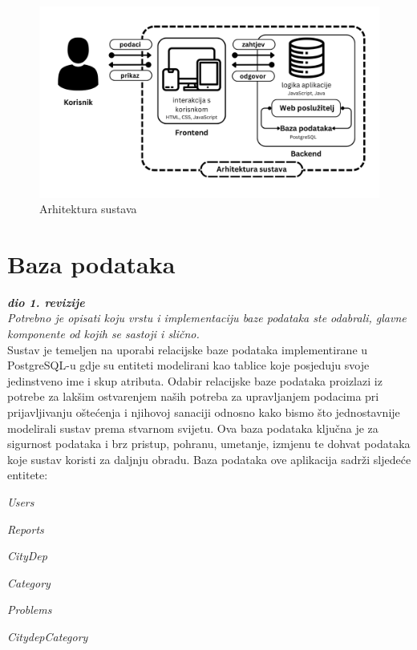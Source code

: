 \begin{figure}[H]
	\includegraphics[scale=0.25]{slike/Arhitektura_sustava.png} %
	\centering
	\caption{Arhitektura sustava}
	\label{fig:Arhitektura}
\end{figure}


\section{Baza podataka}

\textbf{\textit{dio 1. revizije}}\\

\textit{Potrebno je opisati koju vrstu i implementaciju baze podataka ste odabrali, glavne komponente od kojih se sastoji i slično.\\}
\noindent Sustav je temeljen na uporabi relacijske baze podataka implementirane u PostgreSQL-u gdje su entiteti modelirani kao tablice koje posjeduju svoje jedinstveno ime i skup atributa.
Odabir relacijske baze podataka proizlazi iz potrebe za lakšim ostvarenjem naših potreba za upravljanjem podacima pri prijavljivanju oštećenja i njihovoj sanaciji
odnosno kako bismo što jednostavnije modelirali sustav prema stvarnom svijetu.
Ova baza podataka ključna je za sigurnost podataka i brz pristup, pohranu, umetanje, izmjenu te dohvat podataka koje sustav koristi za daljnju obradu.
Baza podataka ove aplikacija sadrži sljedeće entitete:
\begin{packed_item}
	\item \textit{Users}
	\item \textit{Reports}
	\item \textit{CityDep}
	\item \textit{Category}
	\item \textit{Problems}
	\item \textit{CitydepCategory}
\end{packed_item}



